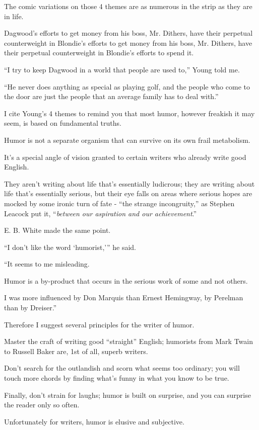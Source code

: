 \documentclass{book}
\numberwithin{equation}{section}
\begin{document}
The comic variations on those 4 themes are as numerous in the strip as they are in life.

Dagwood's efforts to get money from his boss, Mr. Dithers, have their perpetual counterweight in Blondie's efforts to get money from his boss, Mr. Dithers, have their perpetual counterweight in Blondie's efforts to spend it.

``I try to keep Dagwood in a world that people are used to,'' Young told me.

``He never does anything as special as playing golf, and the people who come to the door are just the people that an average family has to deal with.''

%
I cite Young's 4 themes to remind you that most humor, however freakish it may seem, is based on fundamental truths.

Humor is not a separate organism that can survive on its own frail metabolism.

It's a special angle of vision granted to certain writers who already write good English.

They aren't writing about life that's essentially ludicrous; they are writing about life that's essentially serious, but their eye falls on areas where serious hopes are mocked by some ironic turn of fate - ``the strange incongruity,'' as Stephen Leacock put it, ``\textit{between our aspiration and our achievement}.''

E. B. White made the same point.

``I don't like the word `humorist,''' he said.

``It seems to me misleading.

Humor is a by-product that occurs in the serious work of some and not others.

I was more influenced by Don Marquis than Ernest Hemingway, by Perelman than by Dreiser.''

%
Therefore I suggest several principles for the writer of humor.

Master the craft of writing good ``straight'' English; humorists from Mark Twain to Russell Baker are, 1st of all, superb writers.

Don't search for the outlandish and scorn what seems too ordinary; you will touch more chords by finding what's funny in what you know to be true.

Finally, don't strain for laughs; humor is built on surprise, and you can surprise the reader only so often.

%
Unfortunately for writers, humor is elusive and subjective.
\end{document}
